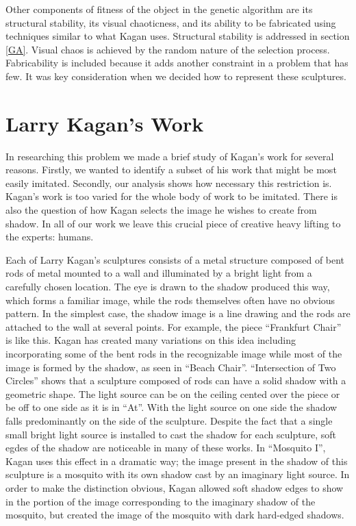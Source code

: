 \documentclass[10pt]{article}
\begin{document}
Other components of fitness of the object in the genetic algorithm
are its structural stability, its visual chaoticness, and its ability
to be fabricated using techniques similar to what Kagan uses. Structural stability
is addressed in section \ref{GA}. Visual
chaos is achieved by the random nature of the selection process.
Fabricability is included because it adds another constraint in a
problem that has few. It was key consideration when we decided
how to represent these sculptures.

\section{Larry Kagan's Work} \label{kagan}
In researching this problem we made a brief study of Kagan's work for
several reasons. Firstly, we wanted to identify a subset of his work
that might be most easily imitated. Secondly, our analysis shows how
necessary this restriction is. Kagan's work is too varied for the
whole body of work to be imitated. There is also the question of how
Kagan selects the image he wishes to create from shadow. In all of our
work we leave this crucial piece of creative heavy lifting to the
experts: humans.

Each of Larry Kagan's sculptures consists of a metal structure
composed of bent rods of metal mounted to a wall and illuminated by
a bright light from a carefully chosen location. The eye is drawn to
the shadow produced this way, which forms a familiar image, while the
rods themselves often have no obvious pattern. In the simplest case,
the shadow image is a line drawing and the rods are attached to the
wall at several points. For example, the piece ``Frankfurt Chair'' is
like this. Kagan has created many variations on this idea including
incorporating some of the bent rods in the recognizable image while
most of the image is formed by the shadow, as seen in ``Beach Chair''.
``Intersection of Two Circles'' shows that a sculpture composed of rods
can have a solid shadow with a geometric shape. The light source can
be on the ceiling cented over the piece or be off to one side as it
is in ``At''. With the light source on one side the shadow falls
predominantly on the side of the sculpture. Despite the fact that a
single small bright light source is installed to cast the shadow for
each sculpture, soft egdes of the shadow are noticeable in many of
these works. In ``Mosquito I'', Kagan uses this effect in a dramatic
way; the image present in the shadow of this sculpture is a mosquito
with its own shadow cast by an imaginary light source. In order to
make the distinction obvious, Kagan allowed soft shadow edges to show
in the portion of the image corresponding to the imaginary shadow of
the mosquito, but created the image of the mosquito with dark
hard-edged shadows.
\end{document}
